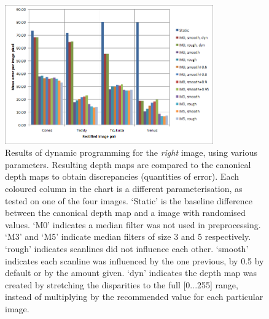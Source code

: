 \begin{figure}[h]
  \centering
  \includegraphics[width=0.8\textwidth]{Stereo-right-report}
  \caption[Results of dynamic programming (left image)]{Results of dynamic programming for the \emph{right} image, using various parameters. Resulting depth maps are compared to the canonical depth maps to obtain discrepancies (quantities of error). Each coloured column in the chart is a different parameterisation, as tested on one of the four images. `Static' is the baseline difference between the canonical depth map and a image with randomised values. `M0' indicates a median filter was not used in preprocessing. `M3' and `M5' indicate median filters of size 3 and 5 respectively. `rough' indicates scanlines did not influence each other. `smooth' indicates each scanline was influenced by the one previous, by 0.5 by default or by the amount given. `dyn' indicates the depth map was created by stretching the disparities to the full [0...255] range, instead of multiplying by the recommended value for each particular image.}
  \label{fig:stereo-right}
\end{figure}


